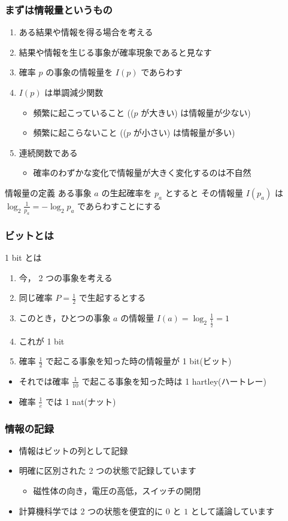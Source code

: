 \begin{frame}
\frametitle{まずは情報量というもの}
  \begin{enumerate}
\item ある結果や情報を得る場合を考える
\item 結果や情報を生じる事象が確率現象であると見なす
\item 確率 $p$ の事象の情報量を \(I(p)\) であらわす
\item \(I(p)\) は単調減少関数
    \begin{itemize}
\item 頻繁に起こっていること ((\(p\) が大きい) は情報量が少ない)
\item 頻繁に起こらないこと ((\(p\) が小さい) は情報量が多い)
    \end{itemize}
\item 連続関数である
    \begin{itemize}
\item 確率のわずかな変化で情報量が大きく変化するのは不自然
    \end{itemize}
  \end{enumerate}
  \begin{block}{情報量の定義}
ある事象 $a$ の生起確率を \(p_a\) とすると
その情報量 \(I(p_a)\) は \(\log_{2}\frac{1}{p_a}=-\log_{2}p_a\) であらわすことにする
  \end{block}
\end{frame}
\begin{frame}
\frametitle{ビットとは}
  \begin{block}{1 bit とは}
    \begin{enumerate}
\item 今， 2 つの事象を考える
\item 同じ確率 \(P=\frac{1}{2}\) で生起するとする
\item このとき，ひとつの事象 $a$ の情報量 \(I(a)=\log_2\frac{1}{\frac{1}{2}}=1\)
\item これが 1 bit
\item 確率 \(\frac{1}{2}\) で起こる事象を知った時の情報量が 1 bit(ビット)
    \end{enumerate}
  \end{block}
  \begin{itemize}
\item それでは確率 \(\frac{1}{10}\) で起こる事象を知った時は 1 hartley(ハートレー)
\item 確率 \(\frac{1}{e}\) では 1 nat(ナット)
  \end{itemize}
\end{frame}
\begin{frame}
\frametitle{情報の記録}
  \begin{itemize}
\item 情報はビットの列として記録
\item 明確に区別された 2 つの状態で記録しています
    \begin{itemize}
\item 磁性体の向き，電圧の高低，スイッチの開閉
    \end{itemize}
\item 計算機科学では 2 つの状態を便宜的に $0$ と $1$ として議論しています
  \end{itemize}
\end{frame}
